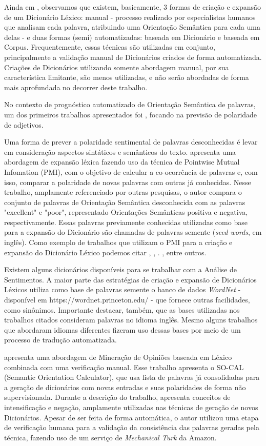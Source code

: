 \documentclass[a4paper,11pt]{article}
\begin{document}
Ainda em \cite{kdir16}, observamos que existem, basicamente, 3 formas de criação e expansão de um Dicionário Léxico: manual -  processo realizado por especialistas humanos que analisam cada palavra, atribuindo uma Orientação Semântica para cada uma delas -  e duas formas (semi) automatizadas: baseada em Dicionário e baseada em Corpus. Frequentemente, essas técnicas são utilizadas em conjunto, principalmente a validação manual de Dicionários criados de forma automatizada. Criações de Dicionários utilizando somente abordagem manual, por sua característica limitante, são menos utilizadas, e não serão abordadas de forma mais aprofundada no decorrer deste trabalho.

No contexto de prognóstico automatizado de Orientação Semântica de palavras, um dos primeiros trabalhos apresentados foi \cite{Hatzivassiloglou}, focando na previsão de polaridade de adjetivos.

Uma forma de prever a polaridade sentimental de palavras desconhecidas é levar em consideração aspectos sintáticos e semânticos do texto. \cite{Turney2002} apresenta uma abordagem de expansão léxica fazendo uso da técnica de Pointwise Mutual Infomation (PMI), com o objetivo de calcular a co-ocorrência de palavras e, com isso, comparar a polaridade de novas palavras com outras já conhecidas. Nesse trabalho, amplamente referenciado por outras pesquisas, o autor compara o conjunto de palavras de Orientação Semântica desconhecida com as palavras "excellent" e "poor", representado Orientações Semânticas positiva e negativa, respectivamente. Essas palavras previamente conhecidas utilizadas como base para a expansão do Dicionário são chamadas de palavras semente (\emph{seed words}, em inglês). Como exemplo de trabalhos que utilizam o PMI para a criação e expansão do Dicionário Léxico podemos citar \cite{becker2013}, \cite{Zhou2014}, \cite{Pinto2007}. \cite{Pantel2006}, entre outros.

Existem alguns dicionários disponíveis para se trabalhar com a Análise de Sentimentos. A maior parte das estratégias de criação e expansão de Dicionários Léxicos utiliza como base de palavras semente o banco de dados \emph{WordNet} - disponível em https://wordnet.princeton.edu/ - que fornece outras facilidades, como sinônimos. Importante destacar, também, que as bases utilizadas nos trabalhos citados consideram palavras no idioma inglês. Mesmo alguns trabalhos que abordaram idiomas diferentes fizeram uso dessas bases por meio de um processo de tradução automatizada.

\cite{taboada2011lexicon} apresenta uma abordagem de Mineração de Opiniões baseada em Léxico combinada com uma verificação manual. Esse trabalho apresenta o SO-CAL (Semantic Orientation Calculator), que usa lista de palavras já consolidadas para a geração de dicionários com novas entradas e suas polaridades de forma não supervisionada. Durante a descrição do trabalho, apresenta conceitos de intensificação e negação, amplamente utilizadas nas técnicas de geração de novos Dicionários. Apesar de ser feita de forma automática, o autor utilizou uma etapa de verificação humana para a validação da consistência das palavras geradas pela técnica, fazendo uso de um serviço de\emph{ Mechanical Turk} da Amazon. 
\end{document}
